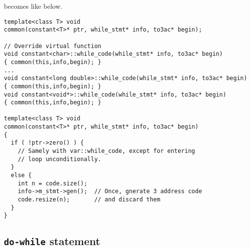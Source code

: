 becomes like below.
\begin{verbatim}
template<class T> void
common(constant<T>* ptr, while_stmt* info, to3ac* begin);

// Override virtual function
void constant<char>::while_code(while_stmt* info, to3ac* begin)
{ common(this,info,begin); }
...
void constant<long double>::while_code(while_stmt* info, to3ac* begin)
{ common(this,info,begin); }
void constant<void*>::while_code(while_stmt* info, to3ac* begin)
{ common(this,info,begin); }

template<class T> void
common(constant<T>* ptr, while_stmt* info, to3ac* begin)
{
  if ( !ptr->zero() ) {
    // Samely with var::while_code, except for entering
    // loop unconditionally.
  }
  else {
    int n = code.size();
    info->m_stmt->gen();  // Once, gnerate 3 address code
    code.resize(n);       // and discard them
  }
}
\end{verbatim}

\subsection{{\tt{do-while}} statement}


